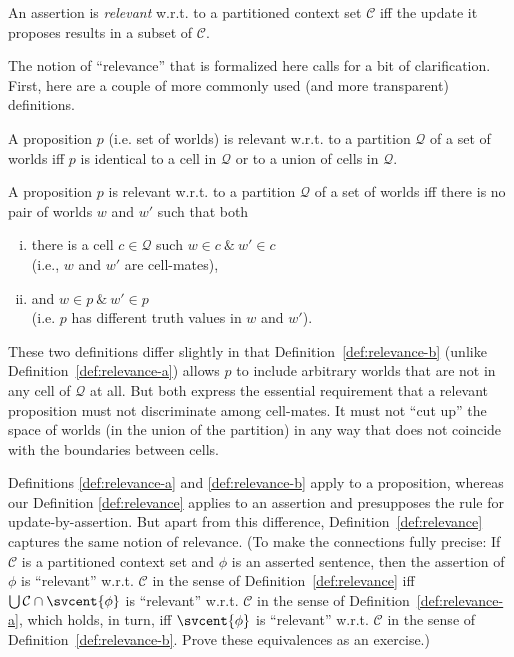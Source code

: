 \begin{definition}[Relevance]\label{def:relevance}
  An assertion is \emph{relevant} w.r.t. to a partitioned context set
  $\mathcal{C}$ iff the update it proposes results in a subset of $\mathcal{C}$.
\end{definition}

The notion of ``relevance'' that is formalized here calls for a bit of
clarification. First, here are a couple of more commonly used (and more
transparent) definitions.

\begin{definition*}[Relevance$'$]\label{def:relevance-a}
  A proposition $p$ (i.e. set of worlds) is relevant w.r.t. to a partition
  $\mathcal{Q}$ of a set of worlds iff $p$ is identical to a cell in
  $\mathcal{Q}$ or to a union of cells in $\mathcal{Q}$.
\end{definition*}

\begin{definition*}[Relevance$''$]\label{def:relevance-b}
  A proposition $p$ is relevant w.r.t. to a partition $\mathcal{Q}$ of a set of
  worlds iff there is no pair of worlds $w$ and $w'$ such that both

  \begin{enumerate}[(i)]
    \item there is a cell $c \in \mathcal{Q}$ such $w \in c\ \&\ w' \in c$\\
    (i.e., $w$ and $w'$ are cell-mates),
    \item and $w \in p\ \&\ w' \in p$\\
    (i.e. $p$ has different truth values in $w$ and $w'$).
  \end{enumerate}
\end{definition*}

These two definitions differ slightly in that Definition~\ref{def:relevance-b}
(unlike Definition~\ref{def:relevance-a}) allows $p$ to include arbitrary worlds
that are not in any cell of $\mathcal{Q}$ at all. But both express the essential
requirement that a relevant proposition must not discriminate among cell-mates.
It must not ``cut up'' the space of worlds (in the union of the partition) in
any way that does not coincide with the boundaries between cells.

Definitions \ref{def:relevance-a} and \ref{def:relevance-b} apply to a
proposition, whereas our Definition \ref{def:relevance} applies to an assertion
and presupposes the rule for update-by-assertion. But apart from this
difference, Definition~\ref{def:relevance} captures the same notion of
relevance. (To make the connections fully precise: If $\mathcal{C}$ is a
partitioned context set and $\phi$ is an asserted sentence, then the assertion
of $\phi$ is ``relevant'' w.r.t. $\mathcal{C}$ in the sense of
Definition~\ref{def:relevance} iff $\bigcup \mathcal{C} \cap \svcent{\phi}$ is
``relevant'' w.r.t. $\mathcal{C}$ in the sense of
Definition~\ref{def:relevance-a}, which holds, in turn, iff $\svcent{\phi}$ is
``relevant'' w.r.t. $\mathcal{C}$ in the sense of
Definition~\ref{def:relevance-b}. Prove these equivalences as an exercise.)

